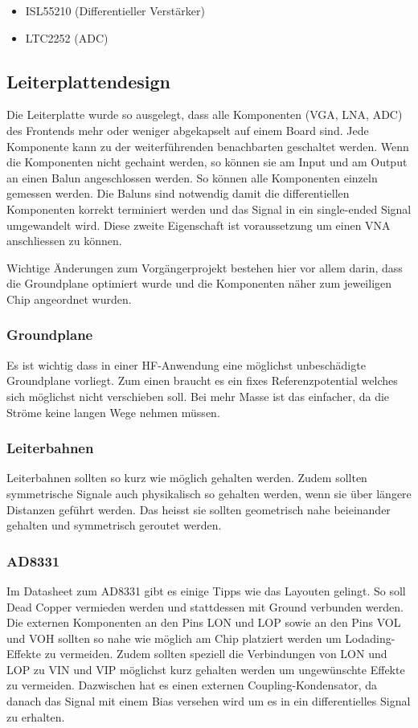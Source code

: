 \begin{itemize}  
	\item ISL55210 (Differentieller Verstärker)
	\item LTC2252 (ADC)
\end{itemize}

\clearpage
\subsection{Leiterplattendesign}
\label{subsec:Leiterplattendesign}
Die Leiterplatte wurde so ausgelegt, dass alle Komponenten (VGA, LNA, ADC) des Frontends mehr oder weniger abgekapselt auf einem Board sind. Jede Komponente kann zu der weiterführenden benachbarten geschaltet werden. Wenn die Komponenten nicht gechaint werden, so können sie am Input und am Output an einen Balun angeschlossen werden. So können alle Komponenten einzeln gemessen werden. Die Baluns sind notwendig damit die differentiellen Komponenten korrekt terminiert werden und das Signal in ein single-ended Signal umgewandelt wird. Diese zweite Eigenschaft ist voraussetzung um einen VNA anschliessen zu können.

Wichtige Änderungen zum Vorgängerprojekt bestehen hier vor allem darin, dass die Groundplane optimiert wurde und die Komponenten näher zum jeweiligen Chip angeordnet wurden.

\subsubsection*{Groundplane}
Es ist wichtig dass in einer HF-Anwendung eine möglichst unbeschädigte Groundplane vorliegt. Zum einen braucht es ein fixes Referenzpotential welches sich möglichst nicht verschieben soll. Bei mehr Masse ist das einfacher, da die Ströme keine langen Wege nehmen müssen.

\subsubsection*{Leiterbahnen}
Leiterbahnen sollten so kurz wie möglich gehalten werden. Zudem sollten symmetrische Signale auch physikalisch so gehalten werden, wenn sie über längere Distanzen geführt werden. Das heisst sie sollten geometrisch nahe beieinander gehalten und symmetrisch geroutet werden. 

\subsubsection*{AD8331}
Im Datasheet zum AD8331 gibt es einige Tipps wie das Layouten gelingt. So soll Dead Copper vermieden werden und stattdessen mit Ground verbunden werden.
Die externen Komponenten an den Pins LON und LOP sowie an den Pins VOL und VOH sollten so nahe wie möglich am Chip platziert werden um Lodading-Effekte zu vermeiden.
Zudem sollten speziell die Verbindungen von LON und LOP zu VIN und VIP möglichst kurz gehalten werden um ungewünschte Effekte zu vermeiden. Dazwischen hat es einen externen Coupling-Kondensator, da danach das Signal mit einem Bias versehen wird um es in ein differentielles Signal zu erhalten.

